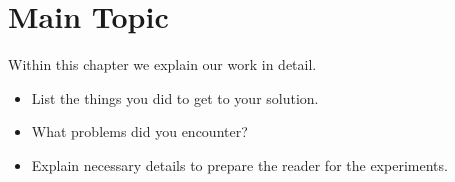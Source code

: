 \chapter{Main Topic}\label{cha:main}

Within this chapter we explain our work in detail.
\begin{itemize}
  \item List the things you did to get to your solution.
  \item What problems did you encounter?
  \item Explain necessary details to prepare the reader for the experiments.
\end{itemize}